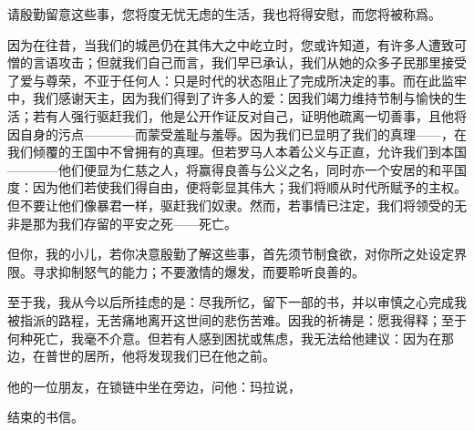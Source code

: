 请殷勤留意这些事，您将度无忧无虑的生活，我也将得安慰，而您将被称爲。\par

因为在往昔，当我们的城邑仍在其伟大之中屹立时，您或许知道，有许多人遭致可憎的言语攻击；但就我们自己而言，我们早已承认，我们从她的众多子民那里接受了爱与尊荣，不亚于任何人：只是时代的状态阻止了完成所决定的事。而在此监牢中，我们感谢天主，因为我们得到了许多人的爱：因我们竭力维持节制与愉快的生活；若有人强行驱赶我们，他是公开作证反对自己，证明他疏离一切善事，且他将因自身的污点————而蒙受羞耻与羞辱。因为我们已显明了我们的真理——，在我们倾覆的王国中不曾拥有的真理。但若罗马人本着公义与正直，允许我们到本国————他们便显为仁慈之人，将赢得良善与公义之名，同时亦一个安居的和平国度：因为他们若使我们得自由，便将彰显其伟大；我们将顺从时代所赋予的主权。但不要让他们像暴君一样，驱赶我们奴隶。然而，若事情已注定，我们将领受的无非是那为我们存留的平安之死——死亡。\par

但你，我的小儿，若你决意殷勤了解这些事，首先须节制食欲，对你所之处设定界限。寻求抑制怒气的能力；不要激情的爆发，而要聆听良善的。\par

至于我，我从今以后所挂虑的是：尽我所忆，留下一部的书，并以审慎之心完成我被指派的路程，无苦痛地离开这世间的悲伤苦难。因我的祈祷是：愿我得释；至于何种死亡，我毫不介意。但若有人感到困扰或焦虑，我无法给他建议：因为在那边，在普世的居所，他将发现我们已在他之前。\par

他的一位朋友，在锁链中坐在旁边，问他：玛拉说，\par

结束的书信。\par

